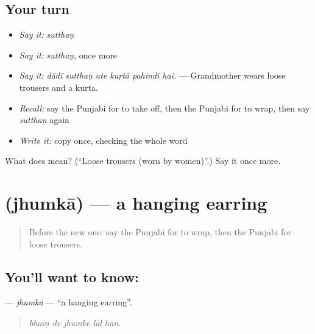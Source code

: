 \subsection*{Your turn}
\begin{itemize}
\raggedright
  \item \emph{Say it:} \emph{sutthaṇ}
  \item \emph{Say it:} \emph{sutthaṇ}, once more
  \item \emph{Say it:} \emph{dādī sutthaṇ ate kuṛtā pahindī hai.} — Grandmother wears loose trousers and a kurta.
  \item \emph{Recall:} say the Punjabi for to take off, then the Punjabi for to wrap, then say \emph{sutthaṇ} again
  \item \emph{Write it:} copy \textbf{} once, checking the whole word
\end{itemize}

\begin{tcolorbox}[breakable,colback=teal!4,colframe=teal!35!black,title={Before you move on}]
What does  mean? (\textquotedblleft{}Loose trousers (worn by women)\textquotedblright{}.) Say it once more.
\end{tcolorbox}
\section[\texorpdfstring{\pa{ਝੁਮਕਾ} (jhumkā)}{ਝੁਮਕਾ (jhumkā)}]{ (jhumkā) — a hanging earring}

\label{lesson:PA-C230-jhumka}



\begin{quote}
Before the new one: say the Punjabi for to wrap, then the Punjabi for loose trousers.
\end{quote}

\subsection*{You'll want to know: }
\textbf{} — \emph{jhumkā} — \textquotedblleft{}a hanging earring\textquotedblright{}.

\begin{quote}
    
\end{quote}

\begin{quote}
\emph{bhaiṇ de jhumke lāl han.}
\end{quote}

